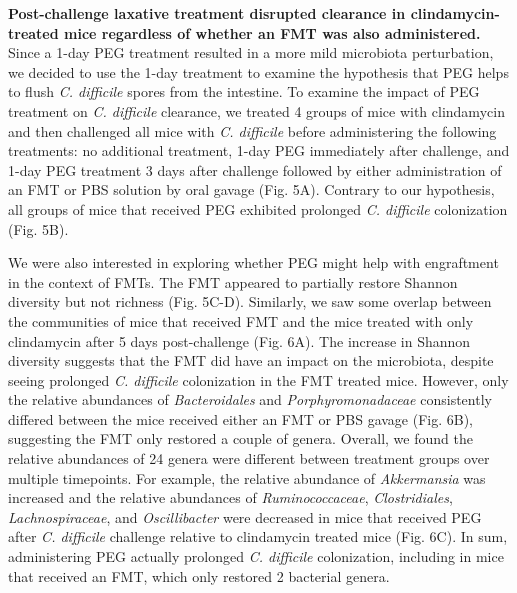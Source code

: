 \documentclass[
  11pt,
]{article}
\begin{document}
\textbf{Post-challenge laxative treatment disrupted clearance in
clindamycin-treated mice regardless of whether an FMT was also
administered.} Since a 1-day PEG treatment resulted in a more mild
microbiota perturbation, we decided to use the 1-day treatment to
examine the hypothesis that PEG helps to flush \emph{C. difficile}
spores from the intestine. To examine the impact of PEG treatment on
\emph{C. difficile} clearance, we treated 4 groups of mice with
clindamycin and then challenged all mice with \emph{C. difficile} before
administering the following treatments: no additional treatment, 1-day
PEG immediately after challenge, and 1-day PEG treatment 3 days after
challenge followed by either administration of an FMT or PBS solution by
oral gavage (Fig. 5A). Contrary to our hypothesis, all groups of mice
that received PEG exhibited prolonged \emph{C. difficile} colonization
(Fig. 5B).

We were also interested in exploring whether PEG might help with
engraftment in the context of FMTs. The FMT appeared to partially
restore Shannon diversity but not richness (Fig. 5C-D). Similarly, we
saw some overlap between the communities of mice that received FMT and
the mice treated with only clindamycin after 5 days post-challenge (Fig.
6A). The increase in Shannon diversity suggests that the FMT did have an
impact on the microbiota, despite seeing prolonged \emph{C. difficile}
colonization in the FMT treated mice. However, only the relative
abundances of \emph{Bacteroidales} and \emph{Porphyromonadaceae}
consistently differed between the mice received either an FMT or PBS
gavage (Fig. 6B), suggesting the FMT only restored a couple of genera.
Overall, we found the relative abundances of 24 genera were different
between treatment groups over multiple timepoints. For example, the
relative abundance of \emph{Akkermansia} was increased and the relative
abundances of \emph{Ruminococcaceae}, \emph{Clostridiales},
\emph{Lachnospiraceae}, and \emph{Oscillibacter} were decreased in mice
that received PEG after \emph{C. difficile} challenge relative to
clindamycin treated mice (Fig. 6C). In sum, administering PEG actually
prolonged \emph{C. difficile} colonization, including in mice that
received an FMT, which only restored 2 bacterial genera.
\end{document}
